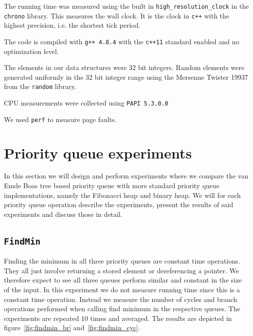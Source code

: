 \documentclass[a4paper,oneside,article,11pt]{memoir}
\begin{document}
The running time was measured using the built in \texttt{high\_resolution\_clock} in the \texttt{chrono} library. This measures the wall clock. It is the clock in \texttt{c++} with the highest precision, i.e. the shortest tick period.

The code is compiled with \texttt{g++ 4.8.4} with the \texttt{c++11} standard enabled and no optimization level.

The elements in our data structures were 32 bit integers. Random elements were generated uniformly in the 32 bit integer range using the Mersenne Twister 19937 from the \texttt{random} library.

CPU measurements were collected using \texttt{PAPI 5.3.0.0}

We used \texttt{perf} to measure page faults.

\chapter{Priority queue experiments}
\label{chap:pqe}
In this section we will design and perform experiments where we compare the van Emde Boas tree based priority queue with more standard priority queue implementations, namely the Fibonacci heap and binary heap. We will for each priority queue operation describe the experiments, present the results of said experiments and discuss those in detail.

\section{\texttt{FindMin}}
Finding the minimum in all three priority queues are constant time operations. They all just involve returning a stored element or dereferencing a pointer. We therefore expect to see all three queues perform similar and constant in the size of the input. In this experiment we do not measure running time since this is a constant time operation. Instead we measure the number of cycles and branch operations performed when calling find minimum in the respective queues. The experiments are repeated 10 times and averaged. The results are depicted in figure~\ref{fig:findmin_br} and~\ref{fig:findmin_cyc}.
\end{document}
